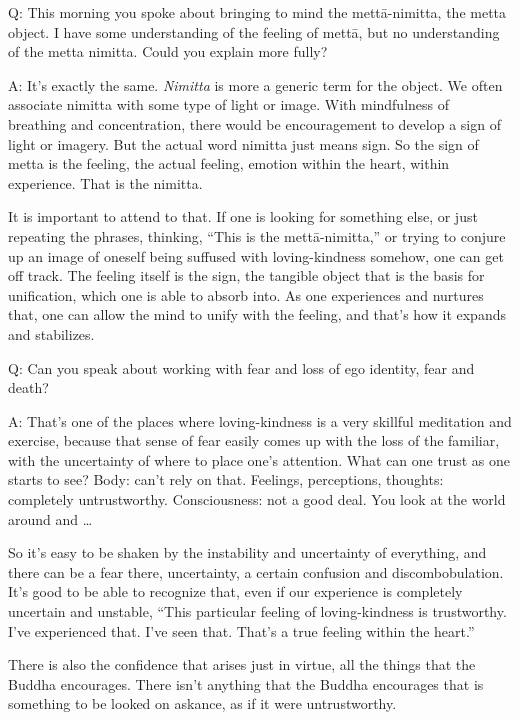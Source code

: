 \vspace{\the\qaskip}
Q: This morning you spoke about bringing to mind the mettā-nimitta, the
metta object. I have some understanding of the feeling of mettā, but no
understanding of the metta nimitta. Could you explain more fully?

\vspace{\the\qaskip}
A: It’s exactly the same. \emph{Nimitta} is more a generic term for the
object. We often associate nimitta with some type of light or image.
With mindfulness of breathing and concentration, there would be
encouragement to develop a sign of light or imagery. But the actual word
nimitta just means sign. So the sign of metta is the feeling, the actual
feeling, emotion within the heart, within experience. That is the
nimitta.

It is important to attend to that. If one is looking for something else,
or just repeating the phrases, thinking, “This is the mettā-nimitta,” or
trying to conjure up an image of oneself being suffused with
loving-kindness somehow, one can get off track. The feeling itself is
the sign, the tangible object that is the basis for unification, which
one is able to absorb into. As one experiences and nurtures that, one
can allow the mind to unify with the feeling, and that’s how it expands
and stabilizes.

\vspace{\the\qaskip}
Q: Can you speak about working with fear and loss of ego identity, fear
and death?

\vspace{\the\qaskip}
A: That’s one of the places where loving-kindness is a very skillful
meditation and exercise, because that sense of fear easily comes up with
the loss of the familiar, with the uncertainty of where to place one’s
attention. What can one trust as one starts to see? Body: can’t rely on
that. Feelings, perceptions, thoughts: completely untrustworthy.
Consciousness: not a good deal. You look at the world around and \ldots{}

So it’s easy to be shaken by the instability and uncertainty of
everything, and there can be a fear there, uncertainty, a certain
confusion and discombobulation. It’s good to be able to recognize that,
even if our experience is completely uncertain and unstable, “This
particular feeling of loving-kindness is trustworthy. I’ve experienced
that. I’ve seen that. That’s a true feeling within the heart.”

There is also the confidence that arises just in virtue, all the things
that the Buddha encourages. There isn’t anything that the Buddha
encourages that is something to be looked on askance, as if it were
untrustworthy.

